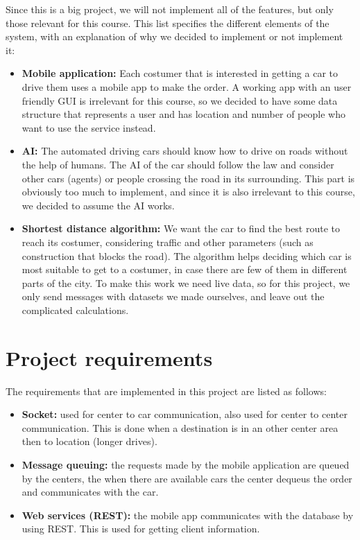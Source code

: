 \documentclass[a4paper]{article}
\begin{document}
Since this is a big project, we will not implement all of the features, but only those relevant for this course. This list specifies the different elements of the system, with an explanation of why we decided to implement or not implement it:
\begin{itemize}
    \item \textbf{Mobile application:} Each costumer that is interested in getting a car to drive them uses a mobile app to make the order. A working app with an user friendly GUI is irrelevant for this course, so we decided to have some data structure that represents a user and has location and number of people who want to use the service instead.
    \item \textbf{AI:} The automated driving cars should know how to drive on roads without the help of humans. The AI of the car should follow the law and consider other cars (agents) or people crossing the road in its surrounding. This part is obviously too much to implement, and since it is also irrelevant to this course, we decided to assume the AI works.
    \item \textbf{Shortest distance algorithm:} We want the car to find the best route to reach its costumer, considering traffic and other parameters (such as construction that blocks the road). The algorithm helps deciding which car is most suitable to get to a costumer, in case there are few of them in different parts of the city. To make this work we need live data, so for this project, we only send messages with datasets we made ourselves, and leave out the complicated calculations.
\end{itemize}

\section*{Project requirements}
The requirements that are implemented in this project are listed as follows:
\begin{itemize}
    \item \textbf{Socket:} used for center to car communication, also used for center to center communication. This is done when a destination is in an other center area then to location (longer drives).
    \item \textbf{Message queuing:} the requests made by the mobile application are queued by the centers, the when there are available cars the center dequeus the order and communicates with the car. 
    \item \textbf{Web services (REST):} the mobile app communicates with the database by using REST. This is used for getting client information.
\end{itemize}
\end{document}
